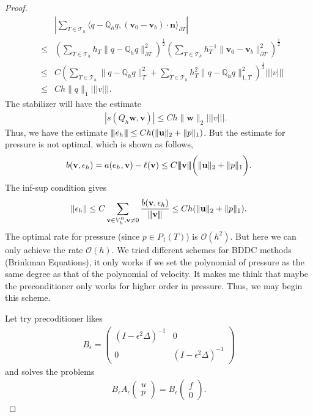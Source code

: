 \documentclass[leqno]{siamltex704}
\numberwithin{equation}{section}
\def\3bar{{|\hspace{-.02in}|\hspace{-.02in}|}}
\def\dQ{{\mathbb{Q}}}
\def\sumT{\sum_{T\in\mathcal{T}_h}}     %
\def\trb{|\!|\!|}
\def\la{\langle}
\def\ra{\rangle_{\partial T}}
\def\bw{{\mathbf{w}}}
\def\bu{{\mathbf{u}}}
\def\bv{{\mathbf{v}}}
\def\bn{{\mathbf{n}}}
\begin{document}
\begin{proof}
  {\color{red}
   \begin{eqnarray*}
    && \left|\sumT\la q-\dQ_h q,(\bv_0-\bv_b)\cdot\bn\ra\right|
    \\
    &\le& \left(\sumT h_T\| q-\dQ_h q\|_{\partial T}^2\right)^\frac12
    \left(\sumT h_T^{-1}\|\bv_0-\bv_b\|_{\partial T}^2\right)^\frac12
    \\
    &\le&  C\left(\sumT \| q-\dQ_h q\|_{T}^2 + \sumT h_T^{2}\| q-\dQ_h q\|_{1,T}^2\right)^\frac12\trb v\trb
    \\
    &\le& Ch\|q\|_{1}\trb v\trb.
  \end{eqnarray*}
  The stabilizer will have the estimate
   \begin{eqnarray*}
    && |s(Q_h\bw,\bv)|
\le Ch\|\bw\|_{2}\trb v\trb.
  \end{eqnarray*}
  Thus, we have the estimate $\3bar e_h\3bar\le Ch(\|\bu\|_2+\|p\|_1)$. But the estimate for pressure is not optimal, which is shown as follows,
  \begin{eqnarray*}
  b(\bv,\epsilon_h)=a(e_h,\bv)-\ell(\bv)\le C\3bar \bv\3bar\bigg(\|\bu\|_2+\|p\|_1\bigg).
  \end{eqnarray*}
  The inf-sup condition gives
  \begin{eqnarray*}
  \|\epsilon_h\|\le C\sum_{\bv\in V_h^0,\bv\neq 0}\frac{b(\bv,\epsilon_h)}{\3bar\bv\3bar}\le Ch(\|\bu\|_2+\|p\|_1).
  \end{eqnarray*}
  The optimal rate for pressure (since $p\in P_1(T)$) is $\mathcal{O}(h^2)$. But here we can only achieve the rate $\mathcal{O}(h)$. We tried different schemes for BDDC methods (Brinkman Equations), it only works if we set the polynomial of pressure as the same degree as that of the polynomial of velocity. It makes me think that maybe the preconditioner only works for higher order in pressure. Thus, we may begin this scheme.
  
Let try precoditioner likes
\begin{eqnarray*}
B_{\epsilon}=\begin{pmatrix}
(I-\epsilon^2\Delta)^{-1} & 0\\
0 &(I-\epsilon^2\Delta)^{-1}
\end{pmatrix}
\end{eqnarray*}  
and solves the problems
\begin{eqnarray*}
B_{\epsilon}A_{\epsilon}\begin{pmatrix}
u\\
p
\end{pmatrix}=B_{\epsilon}\begin{pmatrix}
f\\ 0
\end{pmatrix}.
\end{eqnarray*}
 }
  

\end{proof}
\end{document}
